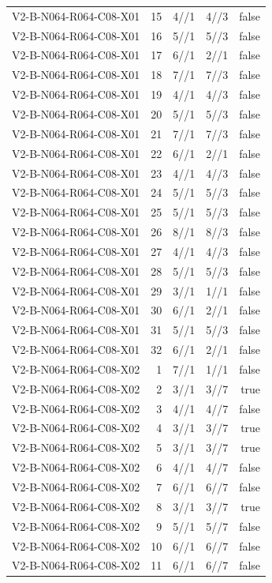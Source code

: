 {\begin{longtable}{lrrrr}
V2-B-N064-R064-C08-X01 & 15 & 4//1 & 4//3 & false \\
V2-B-N064-R064-C08-X01 & 16 & 5//1 & 5//3 & false \\
V2-B-N064-R064-C08-X01 & 17 & 6//1 & 2//1 & false \\
V2-B-N064-R064-C08-X01 & 18 & 7//1 & 7//3 & false \\
V2-B-N064-R064-C08-X01 & 19 & 4//1 & 4//3 & false \\
V2-B-N064-R064-C08-X01 & 20 & 5//1 & 5//3 & false \\
V2-B-N064-R064-C08-X01 & 21 & 7//1 & 7//3 & false \\
V2-B-N064-R064-C08-X01 & 22 & 6//1 & 2//1 & false \\
V2-B-N064-R064-C08-X01 & 23 & 4//1 & 4//3 & false \\
V2-B-N064-R064-C08-X01 & 24 & 5//1 & 5//3 & false \\
V2-B-N064-R064-C08-X01 & 25 & 5//1 & 5//3 & false \\
V2-B-N064-R064-C08-X01 & 26 & 8//1 & 8//3 & false \\
V2-B-N064-R064-C08-X01 & 27 & 4//1 & 4//3 & false \\
V2-B-N064-R064-C08-X01 & 28 & 5//1 & 5//3 & false \\
V2-B-N064-R064-C08-X01 & 29 & 3//1 & 1//1 & false \\
V2-B-N064-R064-C08-X01 & 30 & 6//1 & 2//1 & false \\
V2-B-N064-R064-C08-X01 & 31 & 5//1 & 5//3 & false \\
V2-B-N064-R064-C08-X01 & 32 & 6//1 & 2//1 & false \\
V2-B-N064-R064-C08-X02 & 1 & 7//1 & 1//1 & false \\
V2-B-N064-R064-C08-X02 & 2 & 3//1 & 3//7 & true \\
V2-B-N064-R064-C08-X02 & 3 & 4//1 & 4//7 & false \\
V2-B-N064-R064-C08-X02 & 4 & 3//1 & 3//7 & true \\
V2-B-N064-R064-C08-X02 & 5 & 3//1 & 3//7 & true \\
V2-B-N064-R064-C08-X02 & 6 & 4//1 & 4//7 & false \\
V2-B-N064-R064-C08-X02 & 7 & 6//1 & 6//7 & false \\
V2-B-N064-R064-C08-X02 & 8 & 3//1 & 3//7 & true \\
V2-B-N064-R064-C08-X02 & 9 & 5//1 & 5//7 & false \\
V2-B-N064-R064-C08-X02 & 10 & 6//1 & 6//7 & false \\
V2-B-N064-R064-C08-X02 & 11 & 6//1 & 6//7 & false \\

\end{longtable}}
